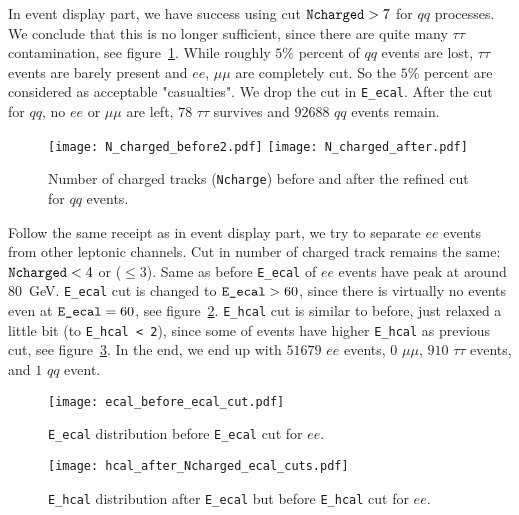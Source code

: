 In event display part, we have success using cut $\verb|Ncharged| > 7$ for $qq$ processes. We conclude that this is no longer sufficient, since there are quite many $\tau\tau$ contamination, see figure~\ref{fig:qq_Ncharged_cuts}. While roughly $5\%$ percent of $qq$ events are lost, $\tau\tau$ events are barely present and $ee$, $\mu\mu$ are completely cut. So the $5\%$ percent are considered as acceptable "casualties". We drop the cut in \verb|E_ecal|. After the cut for $qq$, no $ee$ or $\mu\mu$ are left, $78$ $\tau\tau$ survives and $92688$ $qq$ events remain.
\begin{figure}[ht]
	\centering
	\texttt{[image: N\_charged\_before2.pdf]}
	\texttt{[image: N\_charged\_after.pdf]}
	\cprotect\caption{Number of charged tracks (\verb|Ncharge|) before and after the refined cut for $qq$ events.}%
	\label{fig:qq_Ncharged_cuts}
\end{figure}

Follow the same receipt as in event display part, we try to separate $ee$ events from other leptonic channels. Cut in number of charged track remains the same: $\verb|Ncharged| < 4 $ or ($\leq 3$). Same as before \verb|E_ecal| of $ee$ events have peak at around \SI{80}{\giga\eV}. \verb|E_ecal| cut is changed to $\verb|E_ecal| > 60$, since there is virtually no events even at $\verb|E_ecal| = 60$, see figure~\ref{fig:ee_cuts}. \verb|E_hcal| cut is similar to before, just relaxed a little bit (to \verb|E_hcal < 2|), since some of events have higher \verb|E_hcal| as previous cut, see figure~\ref{fig:ee_cuts_hcal}. In the end, we end up with $51679$ $ee$ events, $0$ $\mu\mu$, $910$ $\tau\tau$ events, and $1$ $qq$ event.
\begin{figure}[ht]
	\centering
	\texttt{[image: ecal\_before\_ecal\_cut.pdf]}
	\cprotect\caption{\verb|E_ecal| distribution before \verb|E_ecal| cut for $ee$. }%
	\label{fig:ee_cuts}
\end{figure}
\begin{figure}[ht]
	\centering
	\texttt{[image: hcal\_after\_Ncharged\_ecal\_cuts.pdf]}
	\cprotect\caption{\verb|E_hcal| distribution after \verb|E_ecal| but before \verb|E_hcal| cut for $ee$.}%
	\label{fig:ee_cuts_hcal}
\end{figure}


